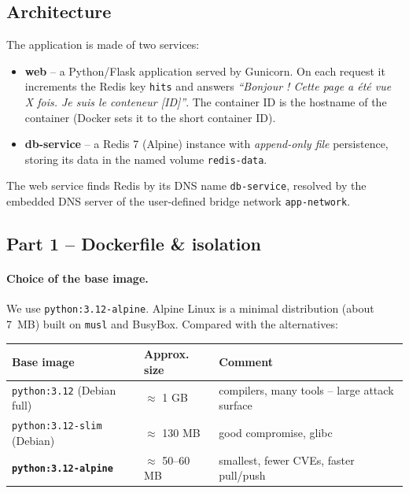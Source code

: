 \documentclass[11pt,a4paper]{article}
\begin{document}
\subsection{Architecture}
The application is made of two services:
\begin{itemize}[leftmargin=1.3em]
  \item \textbf{web} -- a Python/Flask application served by Gunicorn. On each request it
  increments the Redis key \texttt{hits} and answers
  \emph{``Bonjour ! Cette page a été vue X fois. Je suis le conteneur [ID]''}. The container
  ID is the hostname of the container (Docker sets it to the short container ID).
  \item \textbf{db-service} -- a Redis 7 (Alpine) instance with \emph{append-only file}
  persistence, storing its data in the named volume \texttt{redis-data}.
\end{itemize}
The web service finds Redis by its DNS name \texttt{db-service}, resolved by the embedded
DNS server of the user-defined bridge network \texttt{app-network}.



\subsection{Part 1 -- Dockerfile \& isolation}



\paragraph{Choice of the base image.}
We use \texttt{python:3.12-alpine}. Alpine Linux is a minimal distribution
(about 7~MB) built on \texttt{musl} and BusyBox. Compared with the alternatives:

\begin{center}
\begin{tabular}{lll}
\toprule
Base image & Approx. size & Comment\\
\midrule
\texttt{python:3.12} (Debian full) & $\approx$ 1 GB & compilers, many tools -- large attack surface\\
\texttt{python:3.12-slim} (Debian) & $\approx$ 130 MB & good compromise, glibc\\
\textbf{\texttt{python:3.12-alpine}} & $\approx$ 50--60 MB & smallest, fewer CVEs, faster pull/push\\
\bottomrule
\end{tabular}
\end{center}
\end{document}
